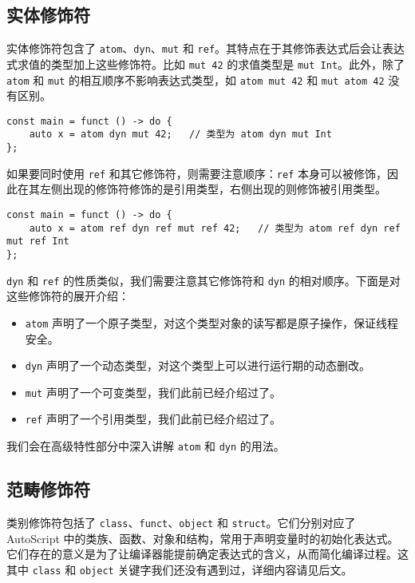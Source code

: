 \subsection{实体修饰符}

实体修饰符包含了 \lstinline!atom!、\lstinline!dyn!、\lstinline!mut! 和 \lstinline!ref!。其特点在于其修饰表达式后会让表达式求值的类型加上这些修饰符。比如 \lstinline!mut 42! 的求值类型是 \lstinline!mut Int!。此外，除了 \lstinline!atom! 和 \lstinline!mut! 的相互顺序不影响表达式类型，如 \lstinline!atom mut 42! 和 \lstinline!mut atom 42! 没有区别。

\begin{lstlisting}
const main = funct () -> do {
    auto x = atom dyn mut 42;   // 类型为 atom dyn mut Int
};
\end{lstlisting}

如果要同时使用 \lstinline!ref! 和其它修饰符，则需要注意顺序：\lstinline!ref! 本身可以被修饰，因此在其左侧出现的修饰符修饰的是引用类型，右侧出现的则修饰被引用类型。

\begin{lstlisting}
const main = funct () -> do {
    auto x = atom ref dyn ref mut ref 42;   // 类型为 atom ref dyn ref mut ref Int
};
\end{lstlisting}

\lstinline!dyn! 和 \lstinline!ref! 的性质类似，我们需要注意其它修饰符和 \lstinline!dyn! 的相对顺序。下面是对这些修饰符的展开介绍：

\begin{itemize}
	\item \lstinline!atom! 声明了一个原子类型，对这个类型对象的读写都是原子操作，保证线程安全。
	
	\item \lstinline!dyn! 声明了一个动态类型，对这个类型上可以进行运行期的动态删改。
	
	\item \lstinline!mut! 声明了一个可变类型，我们此前已经介绍过了。
	
	\item \lstinline!ref! 声明了一个引用类型，我们此前已经介绍过了。
\end{itemize}

我们会在高级特性部分中深入讲解 \lstinline!atom! 和 \lstinline!dyn! 的用法。

\subsection{范畴修饰符}

类别修饰符包括了 \lstinline!class!、\lstinline!funct!、\lstinline!object! 和 \lstinline!struct!。它们分别对应了 AutoScript 中的类族、函数、对象和结构，常用于声明变量时的初始化表达式。它们存在的意义是为了让编译器能提前确定表达式的含义，从而简化编译过程。这其中 \lstinline!class! 和 \lstinline!object! 关键字我们还没有遇到过，详细内容请见后文。 \\

